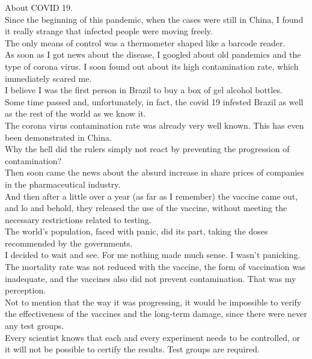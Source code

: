 \documentclass{book}
\begin{document}
About COVID 19. \\

Since the beginning of this pandemic, when the cases were still in China, I found it really strange that infected people were moving freely. \\

The only means of control was a thermometer shaped like a barcode reader. \\

As soon as I got news about the disease, I googled about old pandemics and the type of corona virus. I soon found out about its high contamination rate, which immediately scared me. \\

I believe I was the first person in Brazil to buy a box of gel alcohol bottles. \\

Some time passed and, unfortunately, in fact, the covid 19 infested Brazil as well as the rest of the world as we know it. \\

The corona virus contamination rate was already very well known. This has even been demonstrated in China. \\

Why the hell did the rulers simply not react by preventing the progression of contamination? \\

Then soon came the news about the absurd increase in share prices of companies in the pharmaceutical industry. \\

And then after a little over a year (as far as I remember) the vaccine came out, and lo and behold, they released the use of the vaccine, without meeting the necessary restrictions related to testing. \\

The world's population, faced with panic, did its part, taking the doses recommended by the governments. \\

I decided to wait and see. For me nothing made much sense. I wasn't panicking. The mortality rate was not reduced with the vaccine, the form of vaccination was inadequate, and the vaccines also did not prevent contamination. That was my perception. \\

Not to mention that the way it was progressing, it would be impossible to verify the effectiveness of the vaccines and the long-term damage, since there were never any test groups. \\

Every scientist knows that each and every experiment needs to be controlled, or it will not be possible to certify the results. Test groups are required. \\
\end{document}
